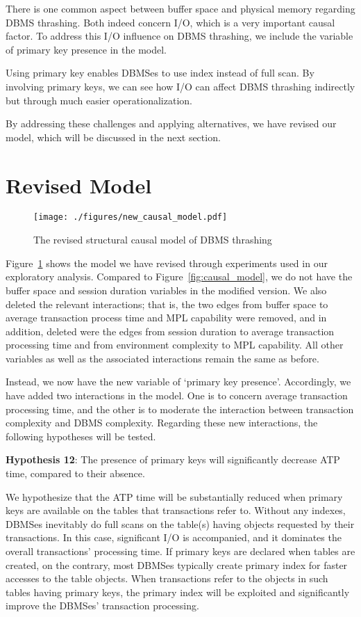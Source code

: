 There is one common aspect between buffer space and physical memory regarding DBMS thrashing.
Both indeed concern I/O, which is a very important causal factor.
To address this I/O influence on DBMS thrashing, 
we include the variable of primary key presence in the model. 

Using primary key enables DBMSes to use index instead of full scan. 
By involving primary keys, 
we can see how I/O can affect DBMS thrashing indirectly but through much easier operationalization.

By addressing these challenges and applying alternatives, 
we have revised our model, which will be discussed in the next section.

\section{Revised Model}\label{sec:revised_model}

\begin{figure}[htp!]
\centering
\texttt{[image: ./figures/new\_causal\_model.pdf]}
\caption{The revised structural causal model of DBMS thrashing~\label{fig:revised_causal_model}}
\end{figure}

Figure~\ref{fig:revised_causal_model} shows the model we have revised through experiments used in our exploratory analysis. 
Compared to Figure~\ref{fig:causal_model}, 
we do not have the buffer space and session duration variables in the modified version. 
We also deleted the relevant interactions; that is, 
the two edges from buffer space to average transaction process time and MPL capability were removed, 
and in addition, deleted were the edges from session duration to average transaction processing time and 
from environment complexity to MPL capability. 
All other variables as well as the associated interactions remain the same as before. 

Instead, we now have the new variable of `primary key presence'.  
Accordingly, we have added two interactions in the model. 
One is to concern average transaction processing time, and 
the other is to moderate the interaction between transaction complexity and DBMS complexity.
Regarding these new interactions, the following hypotheses will be tested.

{\bf Hypothesis 12}: The presence of primary keys will significantly decrease ATP time, compared to their absence.

\noindent 
We hypothesize that the ATP time will be substantially reduced when primary keys are available on the tables that transactions refer to.
Without any indexes, DBMSes inevitably do full scans on the table(s) having objects requested by their transactions. 
In this case, significant I/O is accompanied, and it dominates the overall transactions' processing time. 
If primary keys are declared when tables are created, on the contrary,
most DBMSes typically create primary index for faster accesses to the table objects. 
When transactions refer to the objects in such tables having primary keys, 
the primary index will be exploited and significantly improve the DBMSes' transaction processing.

